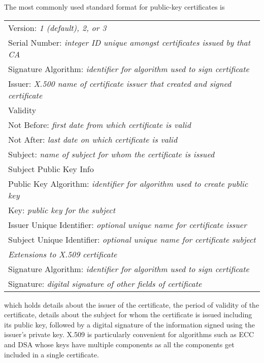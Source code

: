 The most commonly used standard format for public-key certificates is 
\begin{figure*}[htb]\begin{center}
\begin{tabular}{|l|} \hline
  Version: \emph{1 (default), 2, or 3} \\
  Serial Number: \emph{integer ID unique amongst certificates issued by that CA} \\
  Signature Algorithm: \emph{identifier for algorithm used to sign certificate} \\
  Issuer: \emph{X.500 name of certificate issuer that created and signed certificate} \\ \hline
  Validity \\
  \qquad Not Before: \emph{first date from which certificate is valid} \\
  \qquad Not After: \emph{last date on which certificate is valid} \\ \hline
  Subject: \emph{name of subject for whom the certificate is issued} \\ \hline
  Subject Public Key Info \\
  \qquad Public Key Algorithm: \hspace{-1mm}\emph{identifier for algorithm used to create public key}\\
  \qquad Key: \emph{public key for the subject} \\ \hline
  Issuer Unique Identifier: \emph{optional unique name for certificate issuer} \\
  Subject Unique Identifier: \emph{optional unique name for certificate subject} \\ \hline
  \emph{Extensions to X.509 certificate} \\ \hline
  Signature Algorithm: \emph{identifier for algorithm used to sign certificate} \\
  Signature: \emph{digital signature of other fields of certificate} \\ \hline
\end{tabular}\end{center}
\end{figure*}
which holds details about the issuer of the certificate, the period of validity of
the certificate, details about the subject for whom the certificate is issued
including its public key, followed by a digital signature of the information
signed using the issuer's private key.
X.509 is particularly convenient for algorithms such as ECC and DSA whose
keys have multiple components as all the components get included in a single
certificate.

